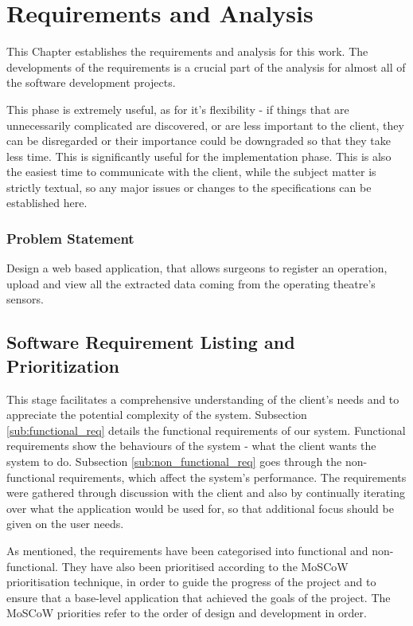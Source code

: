 \chapter{Requirements and Analysis}
\label{chapterlabel3}


This Chapter establishes the requirements and analysis for this work. The developments of the requirements is a crucial part of the analysis for almost all of the software development projects.

This phase is extremely useful, as for it's flexibility - if things that are unnecessarily complicated are discovered, or are less important to the client, they can be disregarded  or their importance could be downgraded so that they take less time. This is significantly useful for the implementation phase. This is also the easiest time to communicate with the client, while the subject matter is strictly textual, so any major issues or changes to the specifications can be established here.


\subsection{Problem Statement}
\label{sub:problem_st}

Design a web based application, that allows surgeons to register an operation, upload and view all the extracted data coming from the operating theatre's sensors.


\section{Software Requirement Listing and Prioritization}
\label{sec:softreqlistandprior} 

This stage facilitates a comprehensive understanding of the client's needs and to appreciate the potential complexity of the system. Subsection \ref{sub:functional_req} details the functional requirements of our system.  Functional requirements show the behaviours of the system - what the client wants the system to do.  Subsection \ref{sub:non_functional_req} goes through the non-functional requirements, which affect the system's performance. 
The requirements were gathered through discussion with the client and also by continually iterating over what the application would be used for, so that additional focus should be given on the user needs.


 As mentioned, the requirements have been categorised into functional and non-functional. They have also been prioritised according to the MoSCoW prioritisation technique\cite{cleggbarker1994}, in order to guide the progress of the project and to ensure that a base-level application that achieved the goals of the project. The MoSCoW priorities refer to the order of design and development in order.




